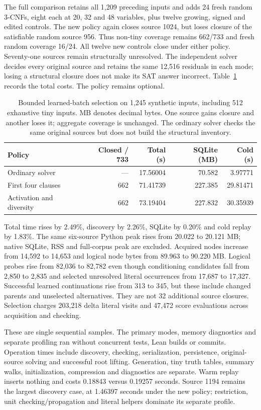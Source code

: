 \documentclass[11pt,a4paper]{article}
\numberwithin{equation}{section}
\theoremstyle{plain}
\theoremstyle{definition}
\theoremstyle{remark}
\begin{document}
The full comparison retains all 1,209 preceding inputs and adds 24 fresh random 3-CNFs, eight each at 20, 32 and 48 variables, plus twelve growing, signed and edited controls. The new policy again closes source 1024, but loses closure of the satisfiable random source 956. Thus non-tiny coverage remains 662/733 and fresh random coverage 16/24. All twelve new controls close under either policy. Seventy-one sources remain structurally unresolved. The independent solver decides every original source and retains the same 12,516 residuals in each mode; losing a structural closure does not make its SAT answer incorrect. Table~\ref{tab:learning-selection} records the total costs. The policy remains optional.

\begin{table}[htbp]
\centering
\small
\begin{tabular}{lrrrr}
\hline
Policy & Closed / 733 & Total (s) & SQLite (MB) & Cold (s) \\
\hline
Ordinary solver & --- & 17.56004 & 70.582 & 3.97771 \\
First four clauses & 662 & 71.41739 & 227.385 & 29.81471 \\
Activation and diversity & 662 & 73.19404 & 227.832 & 30.35939 \\
\hline
\end{tabular}
\caption{Bounded learned-batch selection on 1,245 synthetic inputs, including 512 exhaustive tiny inputs. MB denotes decimal bytes. One source gains closure and another loses it; aggregate coverage is unchanged. The ordinary solver checks the same original sources but does not build the structural inventory.}
\label{tab:learning-selection}
\end{table}

Total time rises by 2.49\%, discovery by 2.26\%, SQLite by 0.20\% and cold replay by 1.83\%. The same six-source Python peak rises from 20.022 to 20.121 MB; native SQLite, RSS and full-corpus peak are excluded. Acquired nodes increase from 14,592 to 14,653 and logical node bytes from 89.963 to 90.220 MB. Logical probes rise from 82,036 to 82,782 even though conditioning candidates fall from 2,850 to 2,835 and selected unresolved literal occurrences from 17,687 to 17,327. Successful learned continuations rise from 313 to 345, but these include changed parents and unselected alternatives. They are not 32 additional source closures. Selection charges 203,218 delta literal visits and 47,472 score evaluations across acquisition and checking.

These are single sequential samples. The primary modes, memory diagnostics and separate profiling ran without concurrent tests, Lean builds or commits. Operation times include discovery, checking, serialization, persistence, original-source solving and successful root lifting. Generation, tiny truth tables, summary walks, initialization, compression and diagnostics are separate. Warm replay inserts nothing and costs 0.18843 versus 0.19257 seconds. Source 1194 remains the largest discovery case, at 1.46397 seconds under the new policy; restriction, unit checking/propagation and literal helpers dominate its separate profile.
\end{document}
